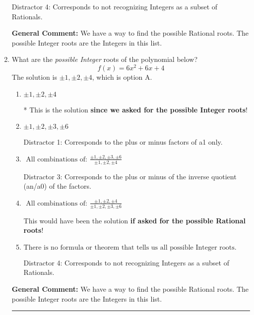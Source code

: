 \documentclass{extbook}[14pt]
\newcommand{\litem}[1]{\item #1

\rule{\textwidth}{0.4pt}}
\begin{document}
\begin{enumerate}
{\begin{enumerate}[label=\Alph*.]
 Distractor 4: Corresponds to not recognizing Integers as a subset of Rationals.
\end{enumerate}

\textbf{General Comment:} We have a way to find the possible Rational roots. The possible Integer roots are the Integers in this list.
}
\litem{
What are the \textit{possible Integer} roots of the polynomial below?
\[ f(x) = 6x^{2} +6 x + 4 \]The solution is \( \pm 1,\pm 2,\pm 4 \), which is option A.\begin{enumerate}[label=\Alph*.]
\item \( \pm 1,\pm 2,\pm 4 \)

* This is the solution \textbf{since we asked for the possible Integer roots}!
\item \( \pm 1,\pm 2,\pm 3,\pm 6 \)

 Distractor 1: Corresponds to the plus or minus factors of a1 only.
\item \( \text{ All combinations of: }\frac{\pm 1,\pm 2,\pm 3,\pm 6}{\pm 1,\pm 2,\pm 4} \)

 Distractor 3: Corresponds to the plus or minus of the inverse quotient (an/a0) of the factors. 
\item \( \text{ All combinations of: }\frac{\pm 1,\pm 2,\pm 4}{\pm 1,\pm 2,\pm 3,\pm 6} \)

This would have been the solution \textbf{if asked for the possible Rational roots}!
\item \( \text{There is no formula or theorem that tells us all possible Integer roots.} \)

 Distractor 4: Corresponds to not recognizing Integers as a subset of Rationals.
\end{enumerate}

\textbf{General Comment:} We have a way to find the possible Rational roots. The possible Integer roots are the Integers in this list.
}
\end{enumerate}
\end{document}
